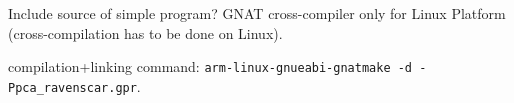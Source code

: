 Include source of simple program?
GNAT cross-compiler only for Linux Platform (cross-compilation has to be done on Linux).

compilation+linking command: \lstinline{arm-linux-gnueabi-gnatmake -d -Ppca_ravenscar.gpr}.


